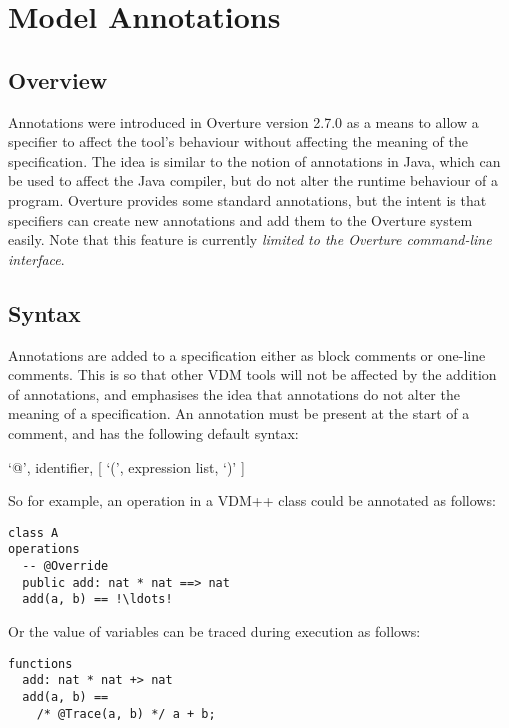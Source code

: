 
\chapter{Model Annotations}\label{sec:annotations}

\section{Overview}

Annotations were introduced in Overture version 2.7.0 as a means to
allow a specifier to affect the tool’s behaviour without affecting the
meaning of the specification. The idea is similar to the notion of
annotations in Java, which can be used to affect the Java compiler,
but do not alter the runtime behaviour of a program. Overture provides
some standard annotations, but the intent is that specifiers can
create new annotations and add them to the Overture system
easily. Note that this feature is currently \emph{limited to the
  Overture command-line interface}.

\section{Syntax}\label{sec:annotations-syntax}

Annotations are added to a specification either as block comments or
one-line comments. This is so that other VDM tools will not be
affected by the addition of annotations, and emphasises the idea that
annotations do not alter the meaning of a specification. An annotation
must be present at the start of a comment, and has the following
default syntax:

\begin{description}
\item `@', identifier, [ `(', expression list, `)' ]
\end{description}

\noindent So for example, an operation in a VDM++ class could be
annotated as follows:

\begin{lstlisting}[language=VDM++, frame=tlbr,escapechar=!]
class A
operations
  -- @Override
  public add: nat * nat ==> nat
  add(a, b) == !\ldots!
\end{lstlisting}

\noindent Or the value of variables can be traced during execution as
follows:

\begin{lstlisting}[language=VDM++, frame=tlbr, label={lst:annotations-trace-ex}]
functions
  add: nat * nat +> nat
  add(a, b) ==
    /* @Trace(a, b) */ a + b;
\end{lstlisting}

